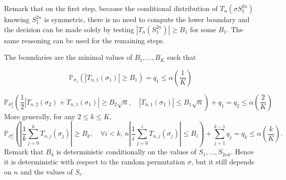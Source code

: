 \documentclass{article}
\theoremstyle{plain}
\theoremstyle{remark}
\renewcommand{\P}{\mathbb{P}}
\newcommand{\1}{\mathbbm{1}}
\numberwithin{equation}{section}
\begin{document}
Remark that on the first step, because the conditional distribution of $T_n(\sigma S_1^{2n})$ knowing $S_1^{2n}$ is symmetric, there is no need to compute the lower boundary and the decision can be made solely by testing $|T_n(S_1^{2n})|\ge B_1$ for some $B_1$. The same reasoning can be used for the remaining steps.

The boundaries are the minimal values of $B_1,\dots, B_K$ such that

$$\P_{\sigma_1}(|T_{n,1}(\sigma_1)|\ge B_1) = q_1 \le \alpha\left(\frac{1}{K}\right) $$

$$\P_{\sigma_1^2}\left( \frac{1}{2}|T_{n,2}(\sigma_2)+T_{n,1}(\sigma_1)|\ge  B_2\sqrt{n},\quad  |T_{n,1}(\sigma_1)|\le  B_1\sqrt{n}  \right)+q_1 = q_2 \le\alpha\left(\frac{2}{K}\right) $$
More generally, for any $2\le k\le K$,
\begin{equation}\label{eq:def_Bk}
\P_{\sigma_1^k}\left(\left|\frac{1}{k}\sum_{j=0}^k T_{n,j}(\sigma_j)\right|\ge B_{k}, \quad \forall i < k,\,  n\left|\frac{1}{i}\sum_{j=0}^i T_{n,j}\left(\sigma_j\right)\right|\le  B_i\right)+\sum_{j=1}^{k-1}q_j  = q_k \le\alpha\left(\frac{k}{K}\right).
\end{equation}
Remark that $B_k$ is deterministic conditionally on the values of $S_1,\dots,S_{2nk}$. Hence it is deterministic with respect to the random permutation $\sigma$, but it still depends on $n$ and the values of $S_i$.
\end{document}
